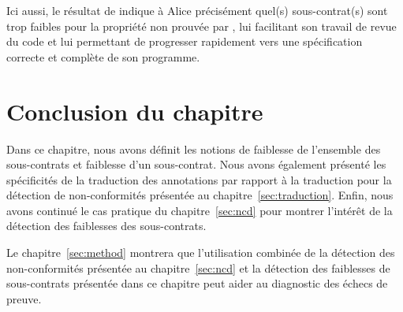 Ici aussi, le résultat de \SWD indique à Alice précisément quel(s)
sous-contrat(s) sont trop faibles pour la propriété non prouvée par \Wp, lui
facilitant son travail de revue du code et lui permettant de progresser
rapidement vers une spécification correcte et complète de son programme.


\section*{Conclusion du chapitre}


Dans ce chapitre, nous avons définit les notions de faiblesse de l'ensemble des
sous-contrats et faiblesse d'un sous-contrat.
Nous avons également présenté les spécificités de la traduction des annotations
par rapport à la traduction pour la détection de non-conformités présentée au
chapitre~\ref{sec:traduction}.
Enfin, nous avons continué le cas pratique du chapitre~\ref{sec:ncd} pour
montrer l'intérêt de la détection des faiblesses des sous-contrats.

Le chapitre~\ref{sec:method} montrera que l'utilisation combinée de la détection
des non-conformités présentée au chapitre~\ref{sec:ncd} et la détection des
faiblesses de sous-contrats présentée dans ce chapitre peut aider au diagnostic
des échecs de preuve.
